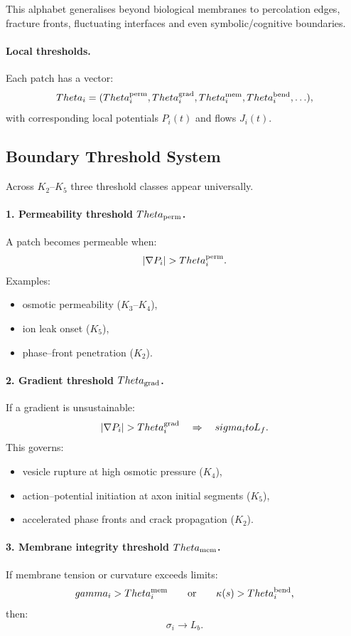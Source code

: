 This alphabet generalises beyond biological membranes to percolation edges,
fracture fronts, fluctuating interfaces and even symbolic/cognitive boundaries.

\paragraph{Local thresholds.}
Each patch has a vector:
\[
  \Theta_i = (\Theta^{\rm perm}_i, \Theta^{\rm grad}_i, \Theta^{\rm mem}_i,
              \Theta^{\rm bend}_i, \ldots ),
\]
with corresponding local potentials \(P_i(t)\) and flows \(J_i(t)\).

\subsection{Boundary Threshold System}

Across \(K_2\)--\(K_5\) three threshold classes appear universally.

\paragraph{1. Permeability threshold \(\Theta_{\rm perm}\).}
A patch becomes permeable when:
\[
  |\nabla P_i| > \Theta^{\rm perm}_i.
\]
Examples:
\begin{itemize}
    \item osmotic permeability (\(K_3\)--\(K_4\)),
    \item ion leak onset (\(K_5\)),
    \item phase–front penetration (\(K_2\)).
\end{itemize}

\paragraph{2. Gradient threshold \(\Theta_{\rm grad}\).}
If a gradient is unsustainable:
\[
  |\nabla P_i| > \Theta^{\rm grad}_i
  \quad\Rightarrow\quad \sigma_i \to L_f.
\]
This governs:
\begin{itemize}
    \item vesicle rupture at high osmotic pressure (\(K_4\)),
    \item action–potential initiation at axon initial segments (\(K_5\)),
    \item accelerated phase fronts and crack propagation (\(K_2\)).
\end{itemize}

\paragraph{3. Membrane integrity threshold \(\Theta_{\rm mem}\).}
If membrane tension or curvature exceeds limits:
\[
  \gamma_i > \Theta^{\rm mem}_i
  \qquad\text{or}\qquad
  \kappa(s) > \Theta^{\rm bend}_i,
\]
then:
\[
  \sigma_i \to L_b.
\]

